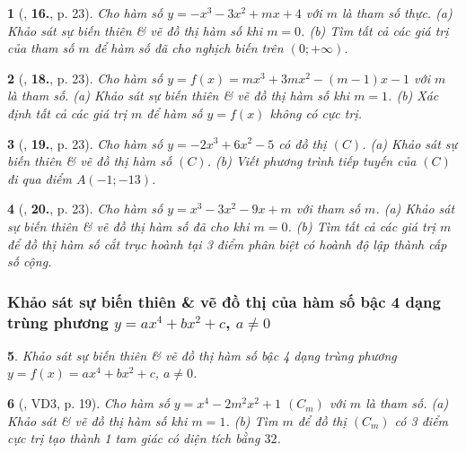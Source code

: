 \documentclass{article}
\newtheorem{baitoan}{}
\begin{document}
\begin{baitoan}[\cite{TLCT_giai_tich_12}, \textbf{16.}, p. 23]
	Cho hàm số $y = -x^3 - 3x^2 + mx + 4$ với $m$ là tham số thực. (a) Khảo sát sự biến thiên \& vẽ đồ thị hàm số khi $m = 0$. (b) Tìm tất cả các giá trị của tham số $m$ để hàm số đã cho nghịch biến trên $(0;+\infty)$.
\end{baitoan}

\begin{baitoan}[\cite{TLCT_giai_tich_12}, \textbf{18.}, p. 23]
	Cho hàm số $y = f(x) = mx^3 + 3mx^2 - (m - 1)x - 1$ với $m$ là tham số. (a) Khảo sát sự biến thiên \& vẽ đồ thị hàm số khi $m = 1$. (b) Xác định tất cả các giá trị $m$ để hàm số $y = f(x)$ không có cực trị.	
\end{baitoan}

\begin{baitoan}[\cite{TLCT_giai_tich_12}, \textbf{19.}, p. 23]
	Cho hàm số $y = -2x^3 + 6x^2 - 5$ có đồ thị $(C)$. (a) Khảo sát sự biến thiên \& vẽ đồ thị hàm số $(C)$. (b) Viết phương trình tiếp tuyến của $(C)$ đi qua điểm $A(-1;-13)$.	
\end{baitoan}

\begin{baitoan}[\cite{TLCT_giai_tich_12}, \textbf{20.}, p. 23]
	Cho hàm số $y = x^3 - 3x^2 - 9x + m$ với tham số $m$. (a) Khảo sát sự biến thiên \& vẽ đồ thị hàm số đã cho khi $m = 0$. (b) Tìm tất cả các giá trị $m$ để đồ thị hàm số cắt trục hoành tại 3 điểm phân biệt có hoành độ lập thành cấp số cộng.	
\end{baitoan}

\subsubsection{Khảo sát sự biến thiên \& vẽ đồ thị của hàm số bậc 4 dạng trùng phương $y = ax^4 + bx^2 + c$, $a\ne 0$}

\begin{baitoan}
	Khảo sát sự biến thiên \& vẽ đồ thị hàm số bậc 4 dạng trùng phương $y = f(x) = ax^4 + bx^2 + c$, $a\ne 0$.
\end{baitoan}

\begin{baitoan}[\cite{TLCT_giai_tich_12}, VD3, p. 19]
	Cho hàm số $y = x^4 - 2m^2x^2 + 1$ $(C_m)$ với $m$ là tham số. (a) Khảo sát \& vẽ đồ thị hàm số khi $m = 1$. (b) Tìm $m$ để đồ thị $(C_m)$ có 3 điểm cực trị tạo thành 1 tam giác có diện tích bằng $32$.	
\end{baitoan}
\end{document}
